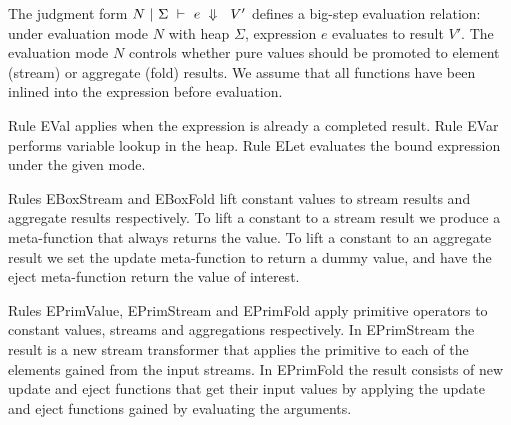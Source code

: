 The judgment form $N~|~\Sigma~\vdash~e~\Downarrow~~V'$ defines a big-step evaluation relation: under evaluation mode $N$ with heap $\Sigma$, expression $e$ evaluates to result $V'$.
The evaluation mode $N$ controls whether pure values should be promoted to element (stream) or aggregate (fold) results. 
We assume that all functions have been inlined into the expression before evaluation.

Rule EVal applies when the expression is already a completed result.
Rule EVar performs variable lookup in the heap.
Rule ELet evaluates the bound expression under the given mode.



Rules EBoxStream and EBoxFold lift constant values to stream results and aggregate results respectively. To lift a constant to a stream result we produce a meta-function that always returns the value. To lift a constant to an aggregate result we set the update meta-function to return a dummy value, and have the eject meta-function return the value of interest.


Rules EPrimValue, EPrimStream and EPrimFold apply primitive operators to constant values, streams and aggregations respectively.
In EPrimStream the result is a new stream transformer that applies the primitive to each of the elements gained from the input streams.
In EPrimFold the result consists of new update and eject functions that get their input values by applying the update and eject functions gained by evaluating the arguments.


